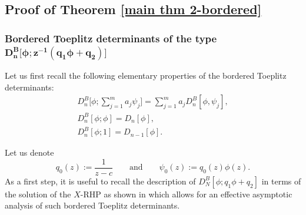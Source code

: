 \documentclass[pdftex]{sigma}
\numberwithin{equation}{section}
\newcommand{\qandq}{\qquad \text{and} \qquad}
\begin{document}
	\subsection{Proof of Theorem \ref{main thm 2-bordered}}\label{Sec 2.2}
	\subsubsection[Bordered Toeplitz determinants of the type \protect{$D^B_{n}\big[\phi;z^{-1}(q_1\phi+q_2)\big]$}]{Bordered Toeplitz determinants of the type $\boldsymbol{ D^B_{n}\big[\phi;z^{-1}(q_1\phi+q_2)\big]}$}
	Let us first recall the following elementary properties of the bordered Toeplitz determinants:
	\begin{gather}
		D^B_n\Bigg[\phi; \sum^m_{j=1} a_j \psi_j\Bigg] =\sum^m_{j=1} a_j D^B_n[\phi,\psi_j],\label{linear-combination}
\\
		D^B_{n}[\phi; \phi] = D_{n}[\phi],\label{border,phi,phi}
\\
		D^B_{n}[\phi;1] = D_{n-1}[\phi].\label{border,phi,const}
	\end{gather}
	
	
	Let us denote \begin{equation}\label{q0}
		q_0(z):= \frac{1}{z-c} \qandq \psi_0(z):=q_0(z)\phi(z).\end{equation}
	As a first step, it is useful to recall the description of $D^B_{N}[\phi;q_1\phi+q_2]$ in terms of the solution of the $X$-RHP as shown in \cite{BEGIL} which allows for an effective asymptotic analysis of such bordered Toeplitz determinants.
	
\end{document}
